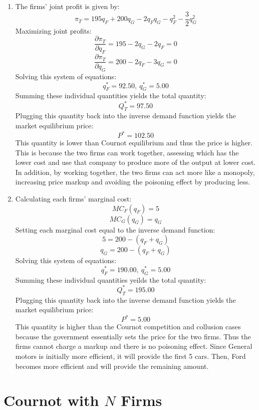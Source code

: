 \documentclass{article}
\begin{document}
\begin{enumerate}
\begin{figure}[H]
        \end{figure}
    \item The firms' joint profit is given by:
        $$\pi_T = 195 q_F + 200 q_G - 2 q_F q_G - q_F^2 - \frac{3}{2} q_G^2$$
        Maximizing joint profits:
        $$\frac{\partial \pi_T}{\partial q_F} = 195 - 2 q_G - 2 q_F = 0$$
        $$\frac{\partial \pi_T}{\partial q_G} = 200 - 2 q_F - 3 q_G = 0$$
        Solving this system of equations:
        $$q_F^* = 92.50,\ q_G^* = 5.00$$
        Summing these individual quantities yields the total quantity:
        $$Q_T^* = 97.50$$
        Plugging this quantity back into the inverse demand function yields the
        market equilibrium price:
        $$P^* = 102.50$$
        This quantity is lower than Cournot equilibrium and thus the price is
        higher. This is because the two firms can work together, assessing which
        has the lower cost and use that company to produce more of the output at
        lower cost. In addition, by working together, the two firms can act more
        like a monopoly, increasing price markup and avoiding the poisoning
        effect by producing less.
    \item Calculating each firms' marginal cost:
        $$MC_F(q_F) = 5$$
        $$MC_G(q_G) = q_G$$
        Setting each marginal cost equal to the inverse demand function:
        $$5 = 200 - (q_F + q_G)$$
        $$q_G = 200 - (q_F+q_G)$$
        Solving this system of equations:
        $$q_F^* = 190.00,\ q_G^* = 5.00$$
        Summing these individual quantities yeilds the total quantity:
        $$Q_T^* = 195.00$$
        Plugging this quantity back into the inverse demand function yields the
        market equilibrium price: 
        $$P^* = 5.00$$
        This quantity is higher than the Cournot competition and collusion cases
        because the government essentially sets the price for the two firms.
        Thus the firms cannot charge a markup and there is no poisoning effect.
        Since General motors is initially more efficient, it will provide the
        first 5 cars. Then, Ford becomes more efficient and will provide the
        remaining amount.
\end{enumerate}

\section{Cournot with $N$ Firms}
\end{document}
